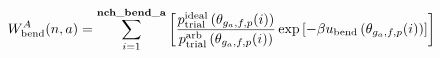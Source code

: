 \documentclass[12pt]{article}
\begin{document}
\begin{displaymath}
W_{\rm bend}^{A}(n,a) = 
\sum_{i=1}^{\bf nch\_bend\_a}
\left[
{{p_{\rm trial}^{\rm ideal}\left(\theta_{g_a,f,p}(i)\right)}\over{ p_{\rm trial}^{\rm arb}\left(\theta_{g_a,f,p}(i)\right)}}
\exp\left[-\beta u_{\rm bend}\left(\theta_{g_a,f,p}(i)\right)\right]
\right]
\end{displaymath}
\end{document}
